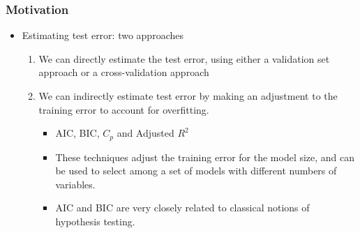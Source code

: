 \documentclass[
  shownotes,
  xcolor={svgnames},
  hyperref={colorlinks,citecolor=DarkBlue,linkcolor=DarkRed,urlcolor=DarkBlue}
  ]{beamer}
\begin{document}
\begin{frame}[fragile]
\frametitle{Motivation}
\begin{itemize}
\item Estimating test error: two approaches
\medskip
\begin{enumerate}
\item We can directly estimate the test error, using either a validation set approach or a cross-validation approach
\medskip
\item We can indirectly estimate test error by making an adjustment to the training error to account for overfitting.
\medskip
\begin{itemize}
  \item AIC, BIC, $C_p$ and Adjusted $R^2$
  \medskip
  \item These techniques adjust the training error for the model size, and can be used to select among a set of models with different numbers of variables.
  \medskip
  \item AIC and BIC are very closely related to classical notions of hypothesis testing. 
\end{itemize}


\end{enumerate}
\end{itemize}

\end{frame}
\end{document}
